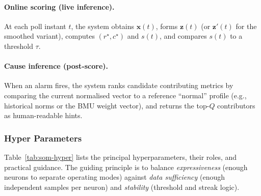 \documentclass[11pt,a4paper]{article}
\begin{document}
\paragraph{Online scoring (live inference).}
At each poll instant $t$, the system obtains $\mathbf{x}(t)$, forms $\mathbf{z}(t)$ (or $\mathbf{z}'(t)$ for the smoothed variant), computes $(r^\star,c^\star)$ and $s(t)$, and compares $s(t)$ to a threshold $\tau$.

\begin{algorithm}[H]
\caption{Live inference with streak-based alarming}
\label{alg:som-live}
\BlankLine
{}
\end{algorithm}

\paragraph{Cause inference (post-score).}
When an alarm fires, the system ranks candidate contributing metrics by comparing the current normalised vector to a reference ``normal'' profile (e.g., historical norms or the BMU weight vector), and returns the top-$Q$ contributors as human-readable hints.

\subsubsection{Hyper Parameters}
\label{subsubsec:som-hyper}

Table~\ref{tab:som-hyper} lists the principal hyperparameters, their roles, and practical guidance. The guiding principle is to balance \emph{expressiveness} (enough neurons to separate operating modes) against \emph{data sufficiency} (enough independent samples per neuron) and \emph{stability} (threshold and streak logic).
\end{document}
